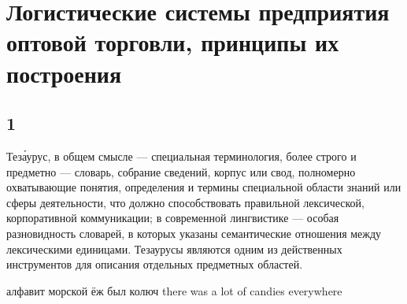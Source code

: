 \section{Логистические системы предприятия оптовой торговли, принципы их построения}
\subsection{1}
Теза́урус, в общем смысле — специальная терминология, более строго и предметно — словарь, собрание сведений, корпус или свод, полномерно охватывающие понятия, определения и термины специальной области знаний или сферы деятельности, что должно способствовать правильной лексической, корпоративной коммуникации; в современной лингвистике — особая разновидность словарей, в которых указаны семантические отношения между лексическими единицами. Тезаурусы являются одним из действенных инструментов для описания отдельных предметных областей.

алфавит морской ёж был колюч 
there was a lot of candies everywhere